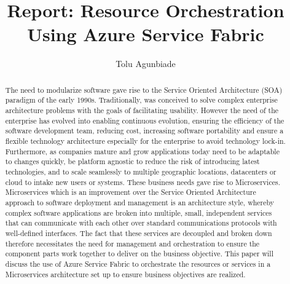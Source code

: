

\title{Report: Resource Orchestration Using Azure Service Fabric}

\author{Tolu Agunbiade}


\renewcommand{\shortauthors}{T. Agunbiade}


\begin{abstract}
The need to modularize software gave rise to the Service Oriented
Architecture (SOA) paradigm of the early 1990s. Traditionally, was
conceived to solve complex enterprise architecture problems with the
goals of facilitating usability. However the need of the enterprise
has evolved into enabling continuous evolution, ensuring the
efficiency of the software development team, reducing cost, increasing
software portability and ensure a flexible technology architecture
especially for the enterprise to avoid technology
lock-in. Furthermore, as companies mature and grow applications today
need to be adaptable to changes quickly, be platform agnostic to
reduce the risk of introducing latest technologies, and to scale
seamlessly to multiple geographic locations, datacenters or cloud to
intake new users or systems. These business needs gave rise to
Microservices. Microservices which is an improvement over the Service
Oriented Architecture approach to software deployment and management
is an architecture style, whereby complex software applications are
broken into multiple, small, independent services that can communicate
with each other over standard communications protocols with
well-defined interfaces. The fact that these services are decoupled
and broken down therefore necessitates the need for management and
orchestration to ensure the component parts work together to deliver
on the business objective. This paper will discuss the use of Azure
Service Fabric to orchestrate the resources or services in a
Microservices architecture set up to ensure business objectives are
realized.

\end{abstract}



\maketitle


